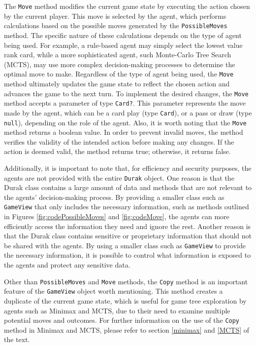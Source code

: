The \texttt{Move} method modifies the current game state by executing the action chosen by the current player. This move is selected by the agent, which performs calculations based on the possible moves generated by the \texttt{PossibleMoves} method. The specific nature of these calculations depends on the type of agent being used. For example, a rule-based agent may simply select the lowest value rank card, while a more sophisticated agent, such Monte-Carlo Tree Search (MCTS), may use more complex decision-making processes to determine the optimal move to make. Regardless of the type of agent being used, the \texttt{Move} method ultimately updates the game state to reflect the chosen action and advances the game to the next turn. To implement the desired changes, the \texttt{Move} method accepts a parameter of type \texttt{Card?}. This parameter represents the move made by the agent, which can be a card play (type \texttt{Card}), or a pass or draw (type \texttt{null}), depending on the role of the agent. Also, it is worth noting that the \texttt{Move} method returns a boolean value. In order to prevent invalid moves, the method verifies the validity of the intended action before making any changes. If the action is deemed valid, the method returns true; otherwise, it returns false.

Additionally, it is important to note that, for efficiency and security purposes, the agents are not provided with the entire \texttt{Durak} object. One reason is that the Durak class contains a large amount of data and methods that are not relevant to the agents' decision-making process. By providing a smaller class such as \texttt{GameView} that only includes the necessary information, such as methods outlined in Figures \ref{fig:codePossibleMoves} and \ref{fig:codeMove}, the agents can more efficiently access the information they need and ignore the rest. Another reason is that the Durak class contains sensitive or proprietary information that should not be shared with the agents. By using a smaller class such as \texttt{GameView} to provide the necessary information, it is possible to control what information is exposed to the agents and protect any sensitive data.

Other than \texttt{PossibleMoves} and \texttt{Move} methods, the \texttt{Copy} method is an important feature of the \texttt{GameView} object worth mentioning. This method creates a duplicate of the current game state, which is useful for game tree exploration by agents such as Minimax and MCTS, due to their need to examine multiple potential moves and outcomes. For further information on the use of the \texttt{Copy} method in Minimax and MCTS, please refer to section \ref{minimax} and \ref{MCTS} of the text.

